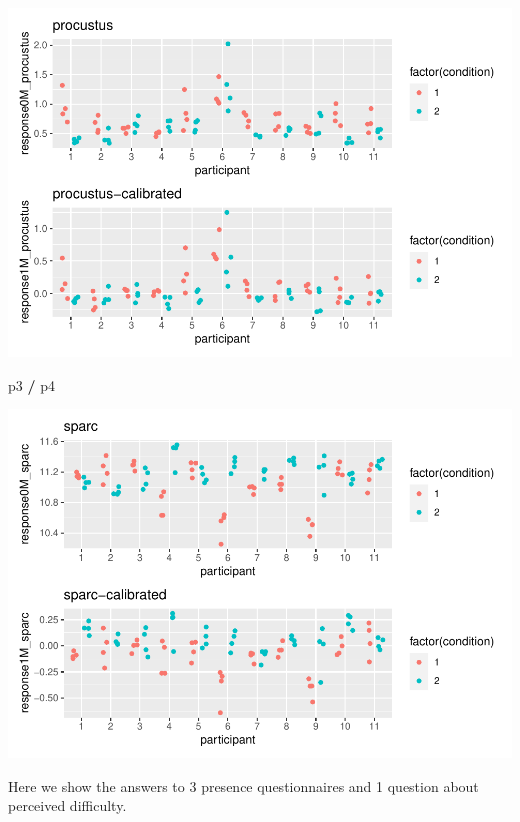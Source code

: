 \documentclass[
]{article}
\newenvironment{Shaded}{\begin{snugshade}}{\end{snugshade}}
\newcommand{\NormalTok}[1]{#1}
\newcommand{\SpecialCharTok}[1]{\textcolor[rgb]{0.81,0.36,0.00}{\textbf{#1}}}
\begin{document}
\includegraphics{06_Publish_GUSO_ASIL_files/figure-latex/showmetrics1-1.pdf}

\begin{Shaded}
\begin{Highlighting}[]
\NormalTok{p3 }\SpecialCharTok{/}\NormalTok{ p4}
\end{Highlighting}
\end{Shaded}

\includegraphics{06_Publish_GUSO_ASIL_files/figure-latex/showmetrics1-2.pdf}

Here we show the answers to 3 presence questionnaires and 1 question
about perceived difficulty.
\end{document}
